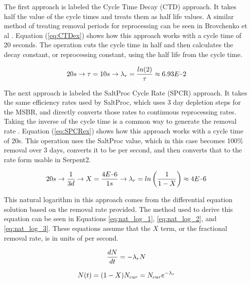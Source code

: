 The first approach is labeled the Cycle Time Decay (CTD) approach. It takes half the value of the cycle times and treats them as half life values. A similar method of treating removal periods for reprocessing can be seen in Brovchenko et al \cite{brovchenko_neutronic_2019}. Equation (\ref{eq:CTDex}) shows how this approach works with a cycle time of 20 seconds. The operation cuts the cycle time in half and then calculates the decay constant, or reprocessing constant, using the half life from the cycle time.

\begin{equation} \hfill
20s \rightarrow \tau = 10s \rightarrow \lambda_{r} = \frac{ln(2)}{\tau} \approx 6.93E\minus 2
\hfill\label{eq:CTDex} \end{equation}

The next approach is labeled the SaltProc Cycle Rate (SPCR) approach. It takes the same efficiency rates used by SaltProc, which uses 3 day depletion steps for the MSBR, and directly converts those rates to continuous reprocessing rates. Taking the inverse of the cycle time is a common way to generate the removal rate \cite{rykhlevskii_modeling_2019, nuttin_potential_2005}. Equation (\ref{eq:SPCRex}) shows how this approach works with a cycle time of 20s. This operation uses the SaltProc value, which in this case becomes 100\% removal over 3 days, converts it to be per second, and then converts that to the rate form usable in Serpent2.

\begin{equation} \hfill
20s \rightarrow \frac{1}{3 d} \rightarrow X = \frac{4E \minus 6}{1 s} \rightarrow \lambda_r = ln \left( \frac{1}{1 - X} \right) \approx 4E \minus 6
\hfill\label{eq:SPCRex} \end{equation}

This natural logarithm in this approach comes from the differential equation solution based on the removal rate provided. The method used to derive this equation can be seen in Equations \eqref{eq:nat_log_1}, \eqref{eq:nat_log_2}, and \eqref{eq:nat_log_3}. These equations assume that the $X$ term, or the fractional removal rate, is in units of per second.

\begin{equation} \hfill
\frac{dN}{dt} = -\lambda_r N
\hfill\label{eq:nat_log_1} \end{equation}

\begin{equation} \hfill
N(t) = (1-X) N_{cur} = N_{cur} e^{-\lambda_r}
\hfill\label{eq:nat_log_2} \end{equation}

